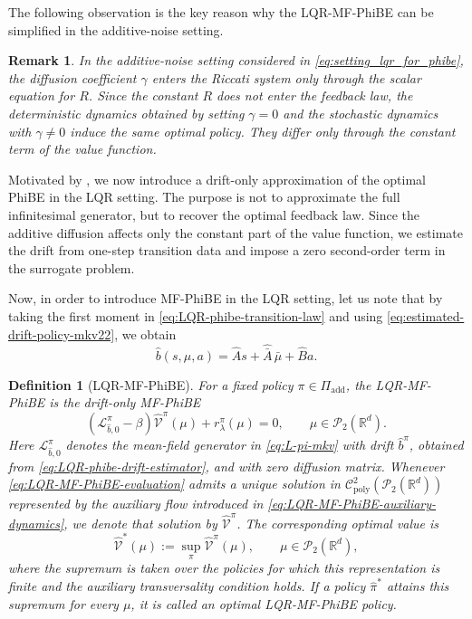 \documentclass[a4paper, 10pt, english, reqno]{amsart}
\newtheorem{definition}[theorem]{Definition}
\newtheorem{remark}[theorem]{Remark}
\begin{document}
The following observation is the key reason why the LQR-MF-PhiBE can be simplified in the additive-noise setting.

\begin{remark}
\label{rem:additive-noise-same-feedback}
In the additive-noise setting considered in \eqref{eq:setting_lqr_for_phibe}, the diffusion coefficient
$\gamma$ enters the Riccati system only through the scalar equation for
$R$. Since the constant $R$ does not enter the feedback law, the
deterministic dynamics obtained by setting $\gamma=0$ and the stochastic
dynamics with $\gamma\neq0$ induce the same optimal policy. They differ
only through the constant term of the value function.
\end{remark}

Motivated by , we now introduce a
drift-only approximation of the optimal PhiBE in the LQR setting. The
purpose is not to approximate the full infinitesimal generator, but to
recover the optimal feedback law. Since the additive diffusion affects
only the constant part of the value function, we estimate the drift from
one-step transition data and impose a zero second-order term in the
surrogate problem.


Now, in order to introduce MF-PhiBE in the LQR setting, let us note that by taking the first moment in \eqref{eq:LQR-phibe-transition-law} and using
\eqref{eq:estimated-drift-policy-mkv22}, we obtain
\begin{equation}
\label{eq:LQR-phibe-drift-estimator}
    \hat b(s,\mu,a)
    =
    \hat A s+\hat{\bar A}\,\bar\mu+\hat B a.
\end{equation}

\begin{definition}[LQR-MF-PhiBE]
\label{def:LQR-MF-PhiBE}
For a fixed policy $\pi\in\Pi_{\mathrm{add}}$, the LQR-MF-PhiBE is the drift-only MF-PhiBE
\begin{equation}
\label{eq:LQR-MF-PhiBE-evaluation}
(\mathcal L_{\hat b,0}^{\pi}-\beta)\hat{\mathcal V}^{\pi}(\mu)
+
r_\lambda^\pi(\mu)
=
0,
\qquad
\mu\in\mathcal P_2(\mathbb R^d).
\end{equation}
Here $\mathcal L_{\hat b,0}^{\pi}$ denotes the mean-field generator in
\eqref{eq:L-pi-mkv} with drift $\hat b^\pi$, obtained from
\eqref{eq:LQR-phibe-drift-estimator}, and with zero diffusion matrix.
Whenever \eqref{eq:LQR-MF-PhiBE-evaluation} admits a unique solution in
$\mathcal C^2_{\mathrm{poly}}(\mathcal P_2(\mathbb R^d))$ represented by
the auxiliary flow introduced in
\eqref{eq:LQR-MF-PhiBE-auxiliary-dynamics}, we denote that solution by
$\hat{\mathcal V}^\pi$. The corresponding optimal value is
\begin{equation}
\label{eq:LQR-MF-PhiBE-optimal-value}
\hat{\mathcal V}^*(\mu)
:=
\sup_{\pi}\hat{\mathcal V}^{\pi}(\mu),
\qquad
\mu\in\mathcal P_2(\mathbb R^d),
\end{equation}
where the supremum is taken over the policies for which this
representation is finite and the auxiliary transversality condition
holds. If a policy $\hat\pi^*$ attains this supremum for every $\mu$, it
is called an optimal LQR-MF-PhiBE policy.
\end{definition}
 
\end{document}
